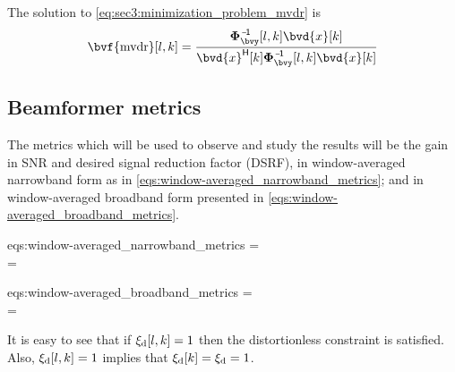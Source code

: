 The solution to \cref{eq:sec3:minimization_problem_mvdr} is
\begin{equation}
	\label{eq:sec3:solution_mvdr_beamformer}
	\bvf{\mvdr}[l,k] = \frac{ \inv{\Corr{\bvy}}[l,k] \bvd{x}[k] }{ \he{\bvd{x}}[k] \inv{\Corr{\bvy}}[l,k] \bvd{x}[k] }
\end{equation}

\subsection{Beamformer metrics}

The metrics which will be used to observe and study the results will be the gain in SNR and desired signal reduction factor (DSRF), in window-averaged narrowband form as in \cref{eqs:window-averaged_narrowband_metrics}; and in window-averaged broadband form presented in \cref{eqs:window-averaged_broadband_metrics}.
%
\begin{subgather}{eqs:window-averaged_narrowband_metrics}
	\gsnr[k] =  \div {} \\
	\dsrf[k] = 
\end{subgather}
\begin{subgather}{eqs:window-averaged_broadband_metrics}
	\gsnr =  \div {} \\
	\dsrf = 
\end{subgather}
It is easy to see that if $\xi_{\mathrm{d}}[l,k] = 1$ then the distortionless constraint is satisfied. Also, $\xi_{\mathrm{d}}[l,k] = 1$ implies that $\xi_{\mathrm{d}}[k] = \xi_{\mathrm{d}} = 1$.